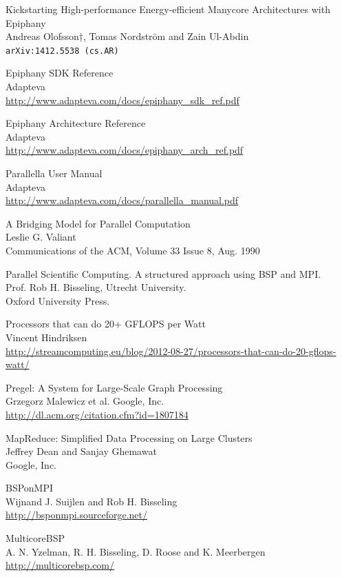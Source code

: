 \documentclass[fleqn]{article}
\renewcommand{\(}{\left(}
\renewcommand{\)}{\right)}
\begin{document}
\newpage

\begin{thebibliography}{9}

    Kickstarting High-performance Energy-efficient Manycore Architectures with Epiphany\\
    Andreas Olofsson†, Tomas Nordström and Zain Ul-Abdin\\
    \texttt{arXiv:1412.5538 (cs.AR)}

    Epiphany SDK Reference\\
    Adapteva\\
    \url{http://www.adapteva.com/docs/epiphany_sdk_ref.pdf}

    Epiphany Architecture Reference\\
    Adapteva\\
    \url{http://www.adapteva.com/docs/epiphany_arch_ref.pdf}

    Parallella User Manual\\
    Adapteva\\
    \url{http://www.adapteva.com/docs/parallella_manual.pdf}

    A Bridging Model for Parallel Computation\\
    Leslie G. Valiant\\
    Communications of the ACM, Volume 33 Issue 8, Aug. 1990

    Parallel Scientific Computing. A structured approach using BSP and MPI.\\
    Prof. Rob H. Bisseling, Utrecht University.\\
    Oxford University Press.

    Processors that can do 20+ GFLOPS per Watt\\
    Vincent Hindriksen\\
    \url{http://streamcomputing.eu/blog/2012-08-27/processors-that-can-do-20-gflops-watt/}

    Pregel: A System for Large-Scale Graph Processing\\
    Grzegorz Malewicz et al.
    Google, Inc.\\
    \url{http://dl.acm.org/citation.cfm?id=1807184}

    MapReduce: Simplified Data Processing on Large Clusters\\
    Jeffrey Dean and Sanjay Ghemawat\\
    Google, Inc.

    BSPonMPI\\
    Wijnand J. Suijlen and Rob H. Bisseling\\
    \url{http://bsponmpi.sourceforge.net/}

    MulticoreBSP\\
    A. N. Yzelman, R. H. Bisseling, D. Roose and K. Meerbergen\\
    \url{http://multicorebsp.com/}

\end{thebibliography}
\end{document}

